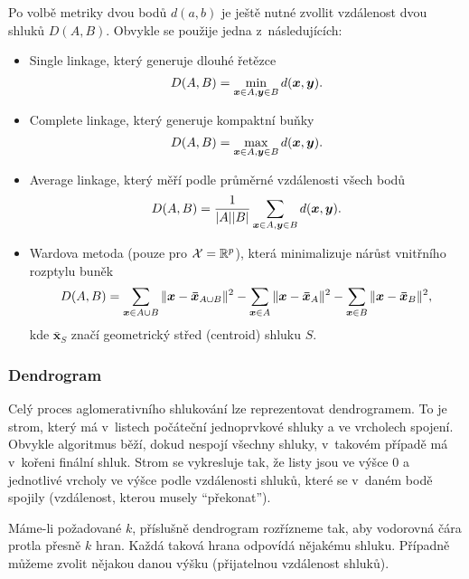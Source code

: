 Po volbě metriky dvou bodů $d(a, b)$ je ještě nutné zvollit vzdálenost dvou shluků $D(A, B)$. Obvykle se použije jedna z~následujících:
\begin{itemize}

    \item Single linkage, který generuje dlouhé řetězce
          \[
              D(A, B) = \min_{\bm{x} \in A,\bm{y} \in B} d(\bm{x}, \bm{y}).
          \]

    \item Complete linkage, který generuje kompaktní buňky
          \[
              D(A, B) = \max_{\bm{x} \in A,\bm{y} \in B} d(\bm{x}, \bm{y}).
          \]

    \item Average linkage, který měří podle průměrné vzdálenosti všech bodů
          \[
              D(A, B) = \frac{1}{|A| |B|} \sum_{\bm{x} \in A,\bm{y} \in B} d(\bm{x}, \bm{y}).
          \]

    \item Wardova metoda (pouze pro $\mathcal{X} = \mathbb{R}^p$), která minimalizuje nárůst vnitřního rozptylu buněk
          \[
              D(A, B) = \sum_{\bm{x} \in A \cup B} \|\bm{x} - \bm{\bar{x}}_{A \cup B} \|^2
              - \sum_{\bm{x} \in A} \|\bm{x} - \bm{\bar{x}}_A \|^2
              - \sum_{\bm{x} \in B} \|\bm{x} - \bm{\bar{x}}_B \|^2,
          \]
          kde $\bm{\bar{x}}_S$ značí geometrický střed (centroid) shluku $S$.

\end{itemize}

\subsubsection{Dendrogram}

Celý proces aglomerativního shlukování lze reprezentovat dendrogramem. To je strom, který má v~listech počáteční jednoprvkové shluky a ve vrcholech spojení. Obvykle algoritmus běží, dokud nespojí všechny shluky, v~takovém případě má v~kořeni finální shluk. Strom se vykresluje tak, že listy jsou ve výšce 0 a jednotlivé vrcholy ve výšce podle vzdálenosti shluků, které se v~daném bodě spojily (vzdálenost, kterou musely ``překonat'').

\begin{center}
    \scalebox{0.8}{}
\end{center}

Máme-li požadované $k$, příslušně dendrogram rozřízneme tak, aby vodorovná čára protla přesně $k$ hran. Každá taková hrana odpovídá nějakému shluku. Případně můžeme zvolit nějakou danou výšku (přijatelnou vzdálenost shluků).


